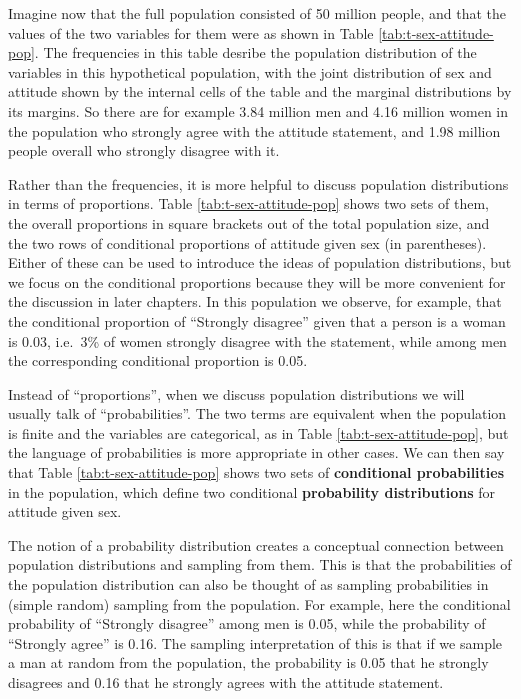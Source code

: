 \documentclass[11pt,a4paper,openany]{book}
\begin{document}
Imagine now that the full population consisted of 50 million people, and
that the values of the two variables for them were as shown in Table
\ref{tab:t-sex-attitude-pop}. The frequencies in this table desribe the
population distribution of the variables in this hypothetical
population, with the joint distribution of sex and attitude shown by the
internal cells of the table and the marginal distributions by its
margins. So there are for example 3.84 million men and 4.16 million
women in the population who strongly agree with the attitude statement,
and 1.98 million people overall who strongly disagree with it.

Rather than the frequencies, it is more helpful to discuss population
distributions in terms of proportions. Table
\ref{tab:t-sex-attitude-pop} shows two sets of them, the overall
proportions in square brackets out of the total population size, and the
two rows of conditional proportions of attitude given sex (in
parentheses). Either of these can be used to introduce the ideas of
population distributions, but we focus on the conditional proportions
because they will be more convenient for the discussion in later
chapters. In this population we observe, for example, that the
conditional proportion of ``Strongly disagree'' given that a person is a
woman is 0.03, i.e.~3\% of women strongly disagree with the statement,
while among men the corresponding conditional proportion is 0.05.

Instead of ``proportions'', when we discuss population distributions we
will usually talk of ``probabilities''. The two terms are equivalent
when the population is finite and the variables are categorical, as in
Table \ref{tab:t-sex-attitude-pop}, but the language of probabilities is
more appropriate in other cases. We can then say that Table
\ref{tab:t-sex-attitude-pop} shows two sets of \textbf{conditional
probabilities} in the population, which define two conditional
\textbf{probability distributions} for attitude given sex.

The notion of a probability distribution creates a conceptual connection
between population distributions and sampling from them. This is that
the probabilities of the population distribution can also be thought of
as sampling probabilities in (simple random) sampling from the
population. For example, here the conditional probability of ``Strongly
disagree'' among men is 0.05, while the probability of ``Strongly
agree'' is 0.16. The sampling interpretation of this is that if we
sample a man at random from the population, the probability is 0.05 that
he strongly disagrees and 0.16 that he strongly agrees with the attitude
statement.
\end{document}
